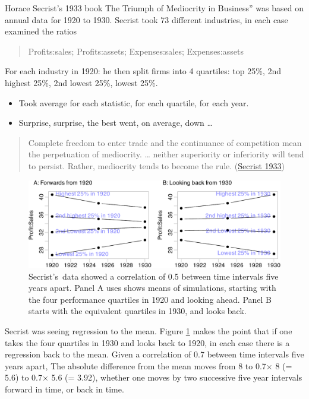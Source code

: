 \documentclass[
  10pt,
  b5paper]{book}
\providecommand{\tightlist}{%
  \setlength{\itemsep}{0pt}\setlength{\parskip}{0pt}}
\begin{document}
Horace Secrist's 1933 book The Triumph of Mediocrity in Business'' was based on annual data for 1920 to 1930. Secrist took 73 different industries, in each case examined the ratios

\begin{quote}
Profits:sales; Profits:assets; Expenses:sales; Expenses:assets
\end{quote}

For each industry in 1920: he then split firms into 4 quartiles: top 25\%, 2nd highest 25\%, 2nd lowest 25\%, lowest 25\%.

\begin{itemize}
\tightlist
\item
  Took average for each statistic, for each quartile, for each year.
\item
  Surprise, surprise, the best went, on average, down \ldots{}
\end{itemize}

\begin{quote}
Complete freedom to enter trade and the continuance of competition mean the perpetuation of mediocrity. \ldots{} neither superiority or inferiority will tend to persist. Rather, mediocrity tends to become the rule. (\protect\hyperlink{ref-secrist1933triumph}{Secrist 1933})
\end{quote}

\begin{figure}[H]

{\centering \includegraphics[width=1.05\linewidth]{07-regress_files/figure-latex/sim-1} 

}

\caption{Secrist's data showed a correlation of 0.5 between
time intervals five years apart.  Panel A uses shows means of simulations,
starting with the four performance quartiles in 1920 and looking ahead.
Panel B starts with the equivalent quartiles in 1930, and looks back.}\label{fig:sim}
\end{figure}

Secrist was seeing regression to the mean. Figure \ref{fig:sim} makes the point that if one takes the four quartiles in 1930 and looks back to 1920, in each case there is a regression back to the mean. Given a correlation of 0.7 between time intervals five years apart, The absolute difference from the mean moves from 8 to 0.7\(\times\) 8 (= 5.6) to 0.7\(\times\) 5.6 (= 3.92), whether one moves by two successive five year intervals forward in time, or back in time.
\end{document}

